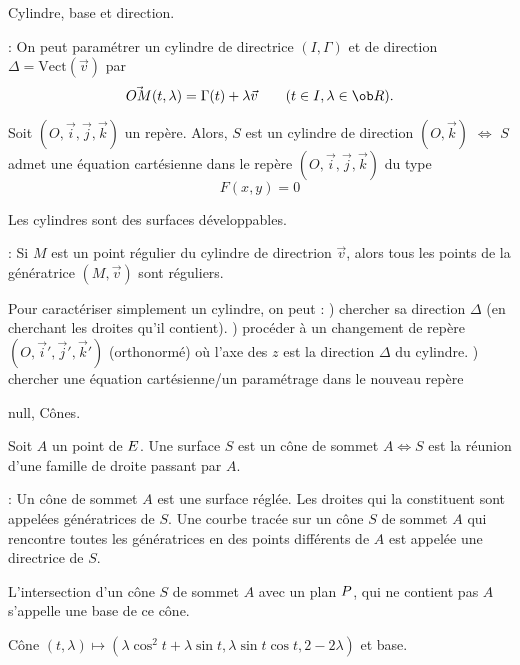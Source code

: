 \centerline{%
}%
\Figure [Index=Surfaces!Cylindre]  Cylindre, base et direction.

\Remarque : On peut param\'etrer un cylindre de directrice $(I,\Gamma)$ et de direction $\Delta=\mbox{Vect}(\vec v)$ par 
$$
\vec{OM}(t,\lambda)=\Gamma(t)+\lambda\vec v\qquad(t\in I,\lambda\in\ob R).
$$

\Propriete [] Soit $(O,\vec i,\vec j,\vec k)$ un rep\`ere. 
Alors, $S$ est un cylindre de direction $(O,\vec k)$ $\Longleftrightarrow$ 
$S$ admet une \'equation cart\'esienne dans le rep\`ere $(O,\vec i,\vec j,\vec k)$ du type 
$$
F(x,y)=0
$$

\Propriete [] Les cylindres sont des surfaces d\'eveloppables. 
\bigskip

\Remarque : Si $M$ est un point r\'egulier du cylindre de directrion $\vec v$, alors 
tous les points de la g\'en\'eratrice $(M,\vec v)$ sont r\'eguliers. 
\bigskip

\Methode [] Pour caract\'eriser simplement un cylindre, on peut : ) chercher sa direction $\Delta$ (en cherchant les droites qu'il contient). ) proc\'eder \`a un changement de rep\`ere $(O,\vec i',\vec j',\vec k')$ (orthonorm\'e) o\`u l'axe des $z$ 
est la direction $\Delta$ du cylindre. ) chercher une \'equation cart\'esienne/un param\'etrage dans le nouveau rep\`ere
\bigskip\goodbreak

\Subsection null, C\^ones.

\Definition [] Soit $A$ un point de $\sc E$. Une surface $S$ est 
un c\^one de sommet $A\Longleftrightarrow S$ est la r\'eunion 
d'une famille de droite passant par $A$. 
\bigskip

\Remarque : Un c\^one de sommet $A$ est une surface r\'egl\'ee. \pn 
Les droites qui la constituent sont appel\'ees g\'en\'eratrices de $S$. \pn
Une courbe trac\'ee sur un c\^one $S$ de sommet $A$ 
qui rencontre toutes les g\'en\'eratrices en des points diff\'erents de $A$ 
est appel\'ee une directrice de $S$. 
\bigskip

\Definition [] L'intersection d'un c\^one $S$ de sommet $A$ avec un plan $\sc P$, 
qui ne contient pas $A$ s'appelle une base de ce c\^one. 
\bigskip

\centerline{%
}%
\Figure [Index=Surfaces!Cone@C\^one]  C\^one 
$(t,\lambda)\mapsto (\lambda\cos^2t+\lambda\sin t, \lambda\sin t\cos t,2-2\lambda)$ et base.
\bigskip

